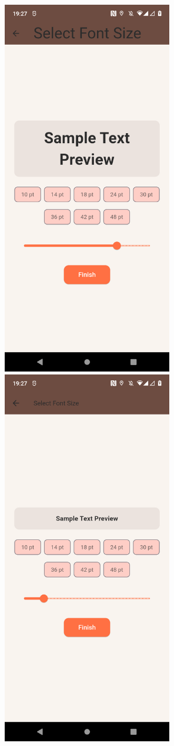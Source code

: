 \documentclass[]{project_interim}
\begin{document}
\begin{figure}[ht!]
  \centering
  \begin{minipage}[t]{0.4\textwidth}
    \includegraphics[width=20em]{fontSize.png}
  \end{minipage}
  \hfill
  \begin{minipage}[t]{0.4\textwidth}
    \includegraphics[width=20em]{fontSizeSelection.png}

\end{minipage}
\end{figure}
\end{document}

